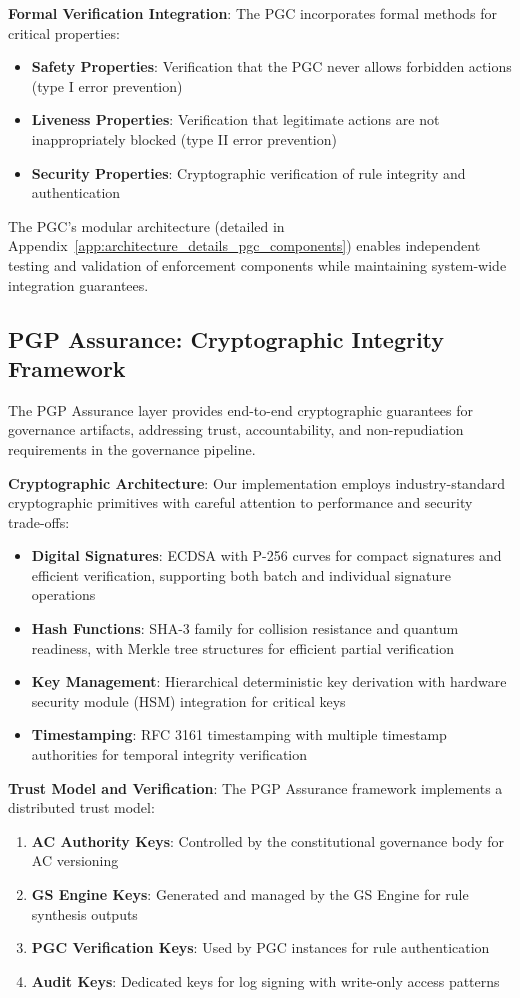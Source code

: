 \documentclass[sigconf,review,anonymous=false]{acmart} %
\begin{document}
\textbf{Formal Verification Integration}: The PGC incorporates formal methods for critical properties:
\begin{itemize}
    \item \textbf{Safety Properties}: Verification that the PGC never allows forbidden actions (type I error prevention)
    \item \textbf{Liveness Properties}: Verification that legitimate actions are not inappropriately blocked (type II error prevention)
    \item \textbf{Security Properties}: Cryptographic verification of rule integrity and authentication
\end{itemize}

The PGC's modular architecture (detailed in Appendix~\ref{app:architecture_details_pgc_components}) enables independent testing and validation of enforcement components while maintaining system-wide integration guarantees.

\subsection{PGP Assurance: Cryptographic Integrity Framework}
\label{subsec:pgp_assurance_detailed}
The PGP Assurance layer provides end-to-end cryptographic guarantees for governance artifacts, addressing trust, accountability, and non-repudiation requirements in the governance pipeline.

\textbf{Cryptographic Architecture}: Our implementation employs industry-standard cryptographic primitives with careful attention to performance and security trade-offs:
\begin{itemize}
    \item \textbf{Digital Signatures}: ECDSA with P-256 curves for compact signatures and efficient verification, supporting both batch and individual signature operations
    \item \textbf{Hash Functions}: SHA-3 family for collision resistance and quantum readiness, with Merkle tree structures for efficient partial verification
    \item \textbf{Key Management}: Hierarchical deterministic key derivation with hardware security module (HSM) integration for critical keys
    \item \textbf{Timestamping}: RFC 3161 timestamping with multiple timestamp authorities for temporal integrity verification
\end{itemize}

\textbf{Trust Model and Verification}: The PGP Assurance framework implements a distributed trust model:
\begin{enumerate}
    \item \textbf{AC Authority Keys}: Controlled by the constitutional governance body for AC versioning
    \item \textbf{GS Engine Keys}: Generated and managed by the GS Engine for rule synthesis outputs
    \item \textbf{PGC Verification Keys}: Used by PGC instances for rule authentication
    \item \textbf{Audit Keys}: Dedicated keys for log signing with write-only access patterns
\end{enumerate}
\end{document}
